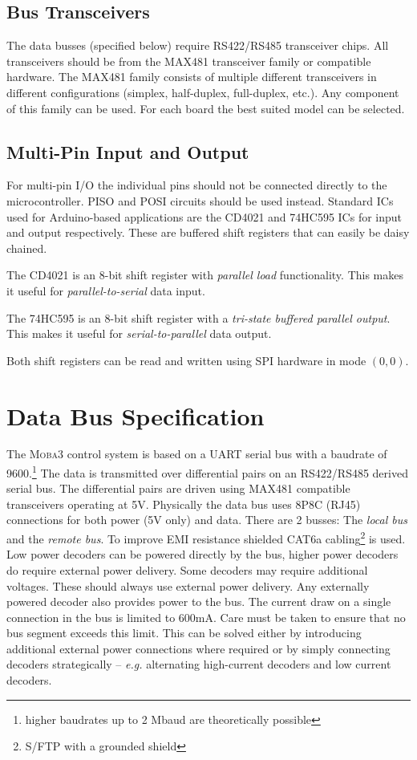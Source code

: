 \documentclass{scrreprt}
\newcommand\eg{\emph{e.g. }}
\begin{document}
\subsection{Bus Transceivers}
The data busses (specified below) require RS422/RS485 transceiver chips.
All transceivers should be from the MAX481 transceiver family or compatible hardware.
The MAX481 family consists of multiple different transceivers in different configurations (simplex, half-duplex, full-duplex, etc.).
Any component of this family can be used.
For each board the best suited model can be selected.

\subsection{Multi-Pin Input and Output}
For multi-pin I/O the individual pins should not be connected directly to the microcontroller.
PISO and POSI circuits should be used instead.
Standard ICs used for Arduino-based applications are the CD4021 and 74HC595 ICs for input and output respectively.
These are buffered shift registers that can easily be daisy chained.

The CD4021 is an 8-bit shift register with \emph{parallel load} functionality.
This makes it useful for \emph{parallel-to-serial} data input.

The 74HC595 is an 8-bit shift register with a \emph{tri-state buffered parallel output}.
This makes it useful for \emph{serial-to-parallel} data output.

Both shift registers can be read and written using SPI hardware in mode $(0,0)$.

\section{Data Bus Specification}
The \textsc{Moba3} control system is based on a UART serial bus with a baudrate of 9600.\footnote{higher baudrates up to 2 Mbaud are theoretically possible}
The data is transmitted over differential pairs on an RS422/RS485 derived serial bus.
The differential pairs are driven using MAX481 compatible transceivers operating at 5V.
Physically the data bus uses 8P8C (RJ45) connections for both power (5V only) and data.
There are 2 busses:
The \emph{local bus} and the \emph{remote bus}.
To improve EMI resistance shielded CAT6a cabling\footnote{S/FTP with a grounded shield} is used.
Low power decoders can be powered directly by the bus, higher power decoders do require external power delivery.
Some decoders may require additional voltages.
These should always use external power delivery.
Any externally powered decoder also provides power to the bus.
The current draw on a single connection in the bus is limited to 600mA.
Care must be taken to ensure that no bus segment exceeds this limit.
This can be solved either by introducing additional external power connections where required or by simply connecting decoders strategically -- \eg alternating high-current decoders and low current decoders.
\end{document}
